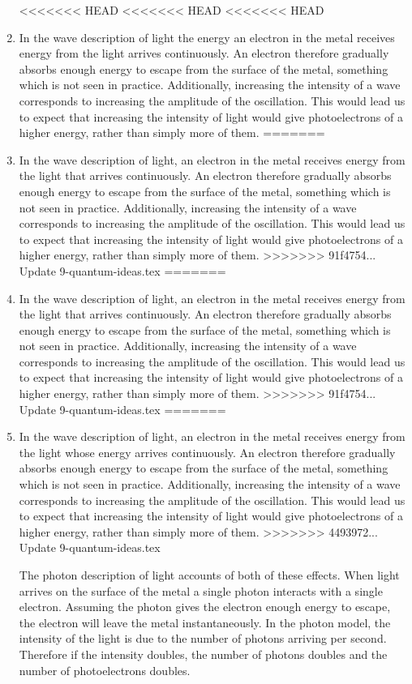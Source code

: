 \documentclass[revision-guide.tex]{subfiles}
\begin{document}
\begin{enumerate}[label=\emph{(\alph*)}]
<<<<<<< HEAD
<<<<<<< HEAD
<<<<<<< HEAD
\item In the wave description of light the energy an electron in the metal receives energy from the light arrives continuously. An electron  therefore gradually absorbs enough energy to escape from the surface of the metal, something which is not seen in practice. Additionally, increasing the intensity of a wave corresponds to increasing the amplitude of the oscillation. This would lead us to expect that increasing the intensity of light would give photoelectrons of a higher energy, rather than simply more of them.
=======
\item In the wave description of light, an electron in the metal receives energy from the light that arrives continuously. An electron therefore gradually absorbs enough energy to escape from the surface of the metal, something which is not seen in practice. Additionally, increasing the intensity of a wave corresponds to increasing the amplitude of the oscillation. This would lead us to expect that increasing the intensity of light would give photoelectrons of a higher energy, rather than simply more of them.
>>>>>>> 91f4754... Update 9-quantum-ideas.tex
=======
\item In the wave description of light, an electron in the metal receives energy from the light that arrives continuously. An electron therefore gradually absorbs enough energy to escape from the surface of the metal, something which is not seen in practice. Additionally, increasing the intensity of a wave corresponds to increasing the amplitude of the oscillation. This would lead us to expect that increasing the intensity of light would give photoelectrons of a higher energy, rather than simply more of them.
>>>>>>> 91f4754... Update 9-quantum-ideas.tex
=======
\item In the wave description of light, an electron in the metal receives energy from the light whose energy arrives continuously. An electron therefore gradually absorbs enough energy to escape from the surface of the metal, something which is not seen in practice. Additionally, increasing the intensity of a wave corresponds to increasing the amplitude of the oscillation. This would lead us to expect that increasing the intensity of light would give photoelectrons of a higher energy, rather than simply more of them.
>>>>>>> 4493972... Update 9-quantum-ideas.tex

The photon description of light accounts of both of these effects. When light arrives on the surface of the metal a single photon interacts with a single electron. Assuming the photon gives the electron enough energy to escape, the electron will leave the metal instantaneously. In the photon model, the intensity of the light is due to the number of photons arriving per second. Therefore if the intensity doubles, the number of photons doubles and the number of photoelectrons doubles.


\end{enumerate}
\end{document}
